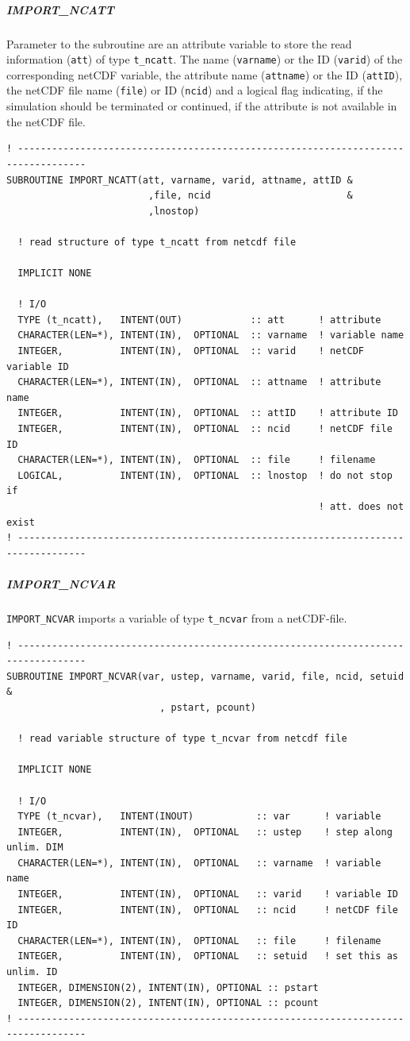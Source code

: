 \documentclass[11pt,twoside]{article}
\begin{document}
\subparagraph{IMPORT\_NCATT\\\label{IMPNCATT}}

Parameter to the subroutine are an attribute variable to store the
read information (\verb|att|) of
type \verb|t_ncatt|. The name (\verb|varname|) or the ID (\verb|varid|)
 of the corresponding netCDF variable, the attribute name 
(\verb|attname|) or the ID (\verb|attID|), the netCDF file name 
(\verb|file|) or ID (\verb|ncid|) and a logical flag indicating, if the
simulation should be terminated or continued, if the attribute is not available
in the netCDF file. 
\begin{verbatim}
! ----------------------------------------------------------------------------------
SUBROUTINE IMPORT_NCATT(att, varname, varid, attname, attID &
                         ,file, ncid                        &
                         ,lnostop)

  ! read structure of type t_ncatt from netcdf file

  IMPLICIT NONE

  ! I/O
  TYPE (t_ncatt),   INTENT(OUT)            :: att      ! attribute
  CHARACTER(LEN=*), INTENT(IN),  OPTIONAL  :: varname  ! variable name
  INTEGER,          INTENT(IN),  OPTIONAL  :: varid    ! netCDF variable ID
  CHARACTER(LEN=*), INTENT(IN),  OPTIONAL  :: attname  ! attribute name
  INTEGER,          INTENT(IN),  OPTIONAL  :: attID    ! attribute ID 
  INTEGER,          INTENT(IN),  OPTIONAL  :: ncid     ! netCDF file ID
  CHARACTER(LEN=*), INTENT(IN),  OPTIONAL  :: file     ! filename
  LOGICAL,          INTENT(IN),  OPTIONAL  :: lnostop  ! do not stop if
                                                       ! att. does not exist
! ----------------------------------------------------------------------------------
\end{verbatim}

\subparagraph{IMPORT\_NCVAR\label{importncvar}\\\label{IMPNCVAR}}
\verb|IMPORT_NCVAR| imports a variable of type \verb|t_ncvar| from a
  netCDF-file.
\begin{verbatim}
! ----------------------------------------------------------------------------------
SUBROUTINE IMPORT_NCVAR(var, ustep, varname, varid, file, ncid, setuid &
                           , pstart, pcount) 

  ! read variable structure of type t_ncvar from netcdf file

  IMPLICIT NONE

  ! I/O
  TYPE (t_ncvar),   INTENT(INOUT)           :: var      ! variable
  INTEGER,          INTENT(IN),  OPTIONAL   :: ustep    ! step along unlim. DIM
  CHARACTER(LEN=*), INTENT(IN),  OPTIONAL   :: varname  ! variable name
  INTEGER,          INTENT(IN),  OPTIONAL   :: varid    ! variable ID
  INTEGER,          INTENT(IN),  OPTIONAL   :: ncid     ! netCDF file ID
  CHARACTER(LEN=*), INTENT(IN),  OPTIONAL   :: file     ! filename
  INTEGER,          INTENT(IN),  OPTIONAL   :: setuid   ! set this as unlim. ID
  INTEGER, DIMENSION(2), INTENT(IN), OPTIONAL :: pstart 
  INTEGER, DIMENSION(2), INTENT(IN), OPTIONAL :: pcount 
! ----------------------------------------------------------------------------------
\end{verbatim}
\end{document}
